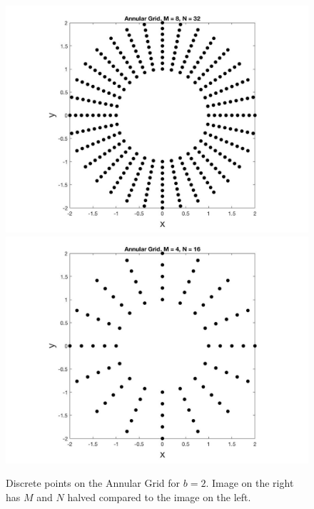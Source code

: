 \documentclass[final]{beamer}
\newlength{\onecolwid}
\newlength{\twocolwid}
\begin{document}
\begin{frame}[t]
\begin{columns}[t]
\begin{column}{\twocolwid}
\begin{columns}[t,totalwidth=\twocolwid]
\begin{column}{\onecolwid}
\begin{figure}
\includegraphics[width= .5\linewidth]{fig_fineGrid.jpg}
\includegraphics[width= .5\linewidth]{fig_coarseGrid.jpg}
\caption{Discrete points on the Annular Grid for $b=2$. Image on the right has $M$ and $N$ halved compared to the image on the left. }
\label{fig:grid}
\end{figure}


\end{column} %

\end{columns} %


\begin{alertblock}


\end{alertblock}
\end{column}
\end{columns}
\end{frame}
\end{document}
